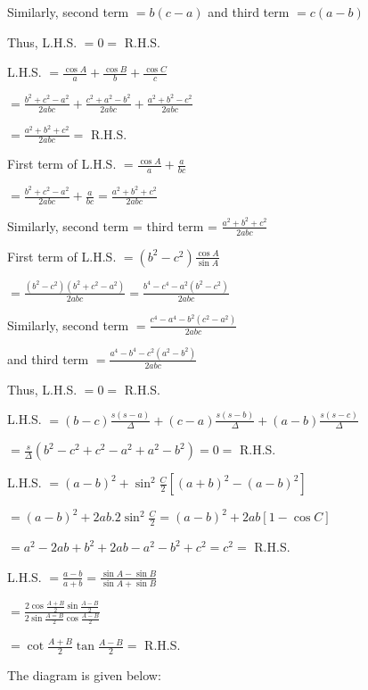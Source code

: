   Similarly, second term $= b(c - a)$ and third term $= c(a - b)$

  Thus, L.H.S. $= 0 =$ R.H.S.

\item L.H.S. $= \frac{\cos A}{a} + \frac{\cos B}{b} + \frac{\cos C}{c}$

  $= \frac{b^2 + c^2 - a^2}{2abc} + \frac{c^2 + a^2 - b^2}{2abc} + \frac{a^2 + b^2 - c^2}{2abc}$

  $= \frac{a^2 + b^2 + c^2}{2abc} =$ R.H.S.

\item First term of L.H.S. $= \frac{\cos A}{a} + \frac{a}{bc}$

  $= \frac{b^2 + c^2 - a^2}{2abc} + \frac{a}{bc} = \frac{a^2 + b^2 + c^2}{2abc}$

  Similarly, second term = third term = $\frac{a^2 + b^2 + c^2}{2abc}$

\item First term of L.H.S. $= (b^2 - c^2)\frac{\cos A}{\sin A}$

  $= \frac{(b^2 - c^2)(b^2 + c^2 - a^2)}{2abc} = \frac{b^4 - c^4 - a^2(b^2 - c^2)}{2abc}$

  Similarly, second term $= \frac{c^4 - a^4 - b^2(c^2 - a^2)}{2abc}$

  and third term $= \frac{a^4 - b^4 - c^2(a^2 - b^2)}{2abc}$

  Thus, L.H.S. $= 0 =$ R.H.S.

\item L.H.S. $= (b - c)\frac{s(s - a)}{\Delta} + (c - a)\frac{s(s - b)}{\Delta} + (a - b)\frac{s(s - c)}{\Delta}$

  $= \frac{s}{\Delta}(b^2 - c^2 + c^2 - a^2 + a^2 - b^2) = 0 =$ R.H.S.

\item L.H.S. $= (a - b)^2 + \sin^2\frac{C}{2}\left[(a + b)^2 - (a - b)^2\right]$

  $= (a - b)^2 + 2ab.2\sin^2\frac{C}{2} = (a - b)^2 + 2ab[1 - \cos C]$

  $= a^2 - 2ab + b^2 +2ab - a^2 - b^2 + c^2 = c^2 =$ R.H.S.

\item L.H.S. $= \frac{a - b}{a + b} = \frac{\sin A - \sin B}{\sin A + \sin B}$

  $= \frac{2\cos\frac{A + B}{2}\sin\frac{A - B}{2}}{2\sin\frac{A = B}{2}\cos\frac{A - B}{2}}$

  $= \cot \frac{A + B}{2}\tan\frac{A - B}{2} =$ R.H.S.

\item The diagram is given below:

